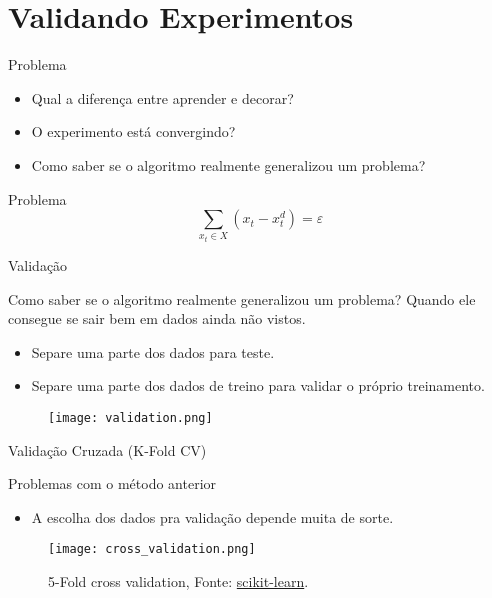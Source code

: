 \section{Validando Experimentos}

\begin{frame}{Problema}
  \begin{itemize}
    \item Qual a diferença entre aprender e decorar?
    \item O experimento está convergindo?
    \item Como saber se o algoritmo realmente generalizou um problema?
  \end{itemize}
\end{frame}

\begin{frame}{Problema}
  \[ \sum_{x_t \in X} (x_t - x_{t}^d) = \varepsilon \]
\end{frame}

\begin{frame}{Validação}
  \begin{block}{Como saber se o algoritmo realmente generalizou um problema?}
  Quando ele consegue se sair bem em dados ainda não vistos.
  \end{block}

  \pause

  \begin{itemize}
    \item Separe uma parte dos dados para teste.
    \item Separe uma parte dos dados de treino para validar o próprio treinamento.
  \end{itemize}

  \begin{figure}[t]
    \texttt{[image: validation.png]}
    \centering
  \end{figure}

\end{frame}

\begin{frame}{Validação Cruzada (K-Fold CV)}
  \begin{block}{Problemas com o método anterior}
    \begin{itemize}
      \item A escolha dos dados pra validação depende muita de sorte.
    \end{itemize}
  \end{block}

  \pause

  \begin{figure}[t]
    \texttt{[image: cross\_validation.png]}
    \caption{5-Fold cross validation, Fonte: \href{https://scikit-learn.org/stable/modules/cross_validation.html}{scikit-learn}.}
    \centering
  \end{figure}

\end{frame}

